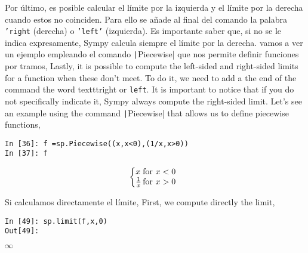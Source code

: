 \begin{paracol}{2}
Por último, es posible calcular el límite por la izquierda y el límite por la derecha cuando estos no coinciden. Para ello se añade al final del comando la palabra \texttt{'right} (derecha) o \texttt{'left'} (izquierda). Es importante saber que, si no se le indica expresamente, Sympy calcula siempre el límite por la derecha. vamos a ver un ejemplo empleando el comando \texttt|Piecewise| que nos permite definir funciones por tramos,
\switchcolumn
Lastly, it is possible to compute the left-sided and right-sided limits for a function when these don't meet. To do it, we need to add a the end of the command the word texttt{right} or \texttt{left}. It is important to notice that if you do not specifically indicate it, Sympy always compute the right-sided limit. Let's see an example using the command \texttt|Piecewise| that allows us to define piecewise functions,
\end{paracol}
\begin{center}
	\begin{minipage}{.6\textwidth}
		\begin{verbatim}
In [36]: f =sp.Piecewise((x,x<0),(1/x,x>0))
In [37]: f
		\end{verbatim}
				\begin{equation*}
			\left\{
			\begin{array}{@{}l@{\,}l}
				x &  \text{for}\ x<0\\
			 \frac{1}{x} & \text{for}\ x>0
			\end{array}
			\right.
		\end{equation*}
	\end{minipage}
\end{center}
\begin{paracol}{2}
Si calculamos directamente el límite,
\switchcolumn
First, we compute directly the limit,
\end{paracol}
\begin{center}
	\begin{minipage}{.6\textwidth}
		\begin{verbatim}
In [49]: sp.limit(f,x,0)
Out[49]: 
		\end{verbatim}
$\infty$
	\end{minipage}
\end{center}

